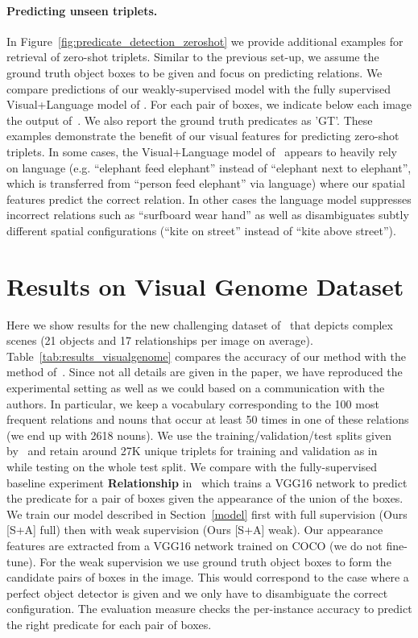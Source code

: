 \documentclass[10pt,twocolumn,letterpaper]{article}
\begin{document}
\paragraph{Predicting unseen triplets.}
In Figure~\ref{fig:predicate_detection_zeroshot} we provide additional examples for retrieval of zero-shot triplets. Similar to the previous set-up, we assume the ground truth object boxes to be given and focus on predicting relations.  We compare predictions of our weakly-supervised model with the fully supervised Visual+Language model of \cite{Lu16}. 
For each pair of boxes, we indicate below each image the output of~\cite{Lu16}. We also report the ground truth predicates as 'GT'. These examples demonstrate the benefit of our visual features for predicting zero-shot triplets. In some cases, the Visual+Language model of~\cite{Lu16} appears to heavily rely on language (e.g. ``elephant feed elephant'' instead of ``elephant next to elephant'', which is transferred from ``person feed elephant'' via language) where our spatial features  predict the correct relation. In other cases the language model suppresses  incorrect relations such as ``surfboard wear hand'' as well as disambiguates subtly different spatial configurations (``kite on street'' instead of ``kite above street'').


\section{Results on Visual Genome Dataset}

\label{part:vg}
Here we show results for the new challenging dataset
of~\cite{Krishna2016} that depicts complex scenes (21 objects and 17
relationships per image on
average). Table~\ref{tab:results_visualgenome} compares the accuracy
of our method with the method of~\cite{Krishna2016}.
Since not all details are given in the paper, we have reproduced the experimental setting as well as we could based on a communication with the authors. In particular, we
keep a vocabulary corresponding to the 100 most frequent relations and nouns that
occur at least 50 times in one of these relations (we end up with 2618
nouns). We use the training/validation/test splits given
by~\cite{Johnson2015} and retain around 27K unique triplets for
training and validation as in~\cite{Krishna2016} while testing on the
whole test split. We compare with the fully-supervised baseline
experiment \textbf{Relationship} in~\cite{Krishna2016} which trains a
VGG16 network to predict the predicate for a pair of boxes given the
appearance of the union of the boxes. We train our model described in
Section~\ref{model} first with full supervision (Ours [S+A] full) then
with weak supervision (Ours [S+A] weak). Our appearance features are
extracted from a VGG16 network trained on COCO (we do not
fine-tune). For the weak supervision we use ground truth object boxes
to form the candidate pairs of boxes in the image. This would
correspond to the case where a perfect object detector is given and we
only have to disambiguate the correct configuration. The evaluation
measure checks the per-instance accuracy to predict the right
predicate for each pair of boxes.  
\end{document}
